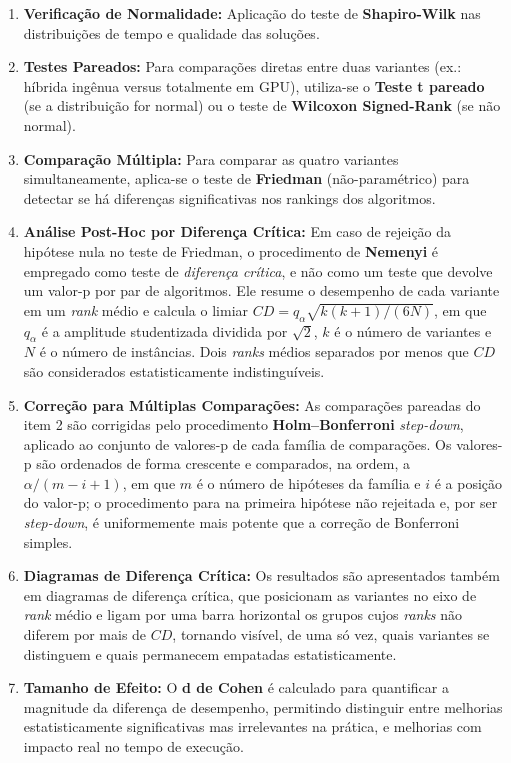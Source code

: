 \begin{enumerate}
  \def\labelenumi{\arabic{enumi}.}
  \tightlist
  \item
        \textbf{Verificação de Normalidade:} Aplicação do teste de \textbf{Shapiro-Wilk} nas distribuições de tempo e qualidade das soluções.
  \item
        \textbf{Testes Pareados:} Para comparações diretas entre duas variantes (ex.: híbrida ingênua versus totalmente em GPU), utiliza-se o \textbf{Teste t pareado} (se a distribuição for normal) ou o teste de \textbf{Wilcoxon Signed-Rank} (se não normal).
  \item
        \textbf{Comparação Múltipla:} Para comparar as quatro variantes simultaneamente, aplica-se o teste de \textbf{Friedman} (não-paramétrico) para detectar se há diferenças significativas nos rankings dos algoritmos.
  \item
        \textbf{Análise Post-Hoc por Diferença Crítica:} Em caso de rejeição da hipótese nula no teste de Friedman, o procedimento de \textbf{Nemenyi} é empregado como teste de \emph{diferença crítica}, e não como um teste que devolve um valor-p por par de algoritmos.
        Ele resume o desempenho de cada variante em um \emph{rank} médio e calcula o limiar \(CD = q_\alpha \sqrt{k(k+1)/(6N)}\), em que \(q_\alpha\) é a amplitude studentizada dividida por \(\sqrt{2}\), \(k\) é o número de variantes e \(N\) é o número de instâncias.
        Dois \emph{ranks} médios separados por menos que \(CD\) são considerados estatisticamente indistinguíveis.
  \item
        \textbf{Correção para Múltiplas Comparações:} As comparações pareadas do item 2 são corrigidas pelo procedimento \textbf{Holm--Bonferroni} \emph{step-down}, aplicado ao conjunto de valores-p de cada família de comparações.
        Os valores-p são ordenados de forma crescente e comparados, na ordem, a \(\alpha/(m-i+1)\), em que \(m\) é o número de hipóteses da família e \(i\) é a posição do valor-p; o procedimento para na primeira hipótese não rejeitada e, por ser \emph{step-down}, é uniformemente mais potente que a correção de Bonferroni simples.
  \item
        \textbf{Diagramas de Diferença Crítica:} Os resultados são apresentados também em diagramas de diferença crítica, que posicionam as variantes no eixo de \emph{rank} médio e ligam por uma barra horizontal os grupos cujos \emph{ranks} não diferem por mais de \(CD\), tornando visível, de uma só vez, quais variantes se distinguem e quais permanecem empatadas estatisticamente.
  \item
        \textbf{Tamanho de Efeito:} O \textbf{d de Cohen} é calculado para quantificar a magnitude da diferença de desempenho, permitindo distinguir entre melhorias estatisticamente significativas mas irrelevantes na prática, e melhorias com impacto real no tempo de execução.
\end{enumerate}

